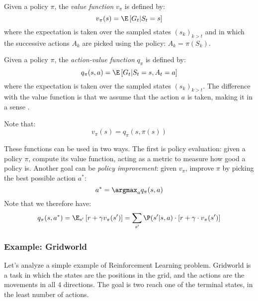 \begin{definition}
    Given a policy $\pi$, the \emph{value function} $v_\pi$ is defined by:
    \begin{equation*}
        v_\pi(s) = \E\left[G_t|S_t=s\right]
    \end{equation*}
    where the expectation is taken over the sampled states $(s_k)_{k>t}$ and in which the successive actions $A_k$ are picked using the policy: $A_k=\pi(S_k)$.
\end{definition}

\begin{definition}
    Given a policy $\pi$, the \emph{action-value function} $q_\pi$ is defined by:
    \begin{equation*}
        q_\pi(s, a) = \E\left[G_t|S_t=s, A_t=a\right]
    \end{equation*}
    where the expectation is taken over the sampled states $(s_k)_{k>t}$. The difference with the value function is that we assume that the action $a$ is taken, making it in a sense .
\end{definition}
Note that:
\begin{equation*}
    v_\pi(s)=q_\pi(s,\pi(s))
\end{equation*}

These functions can be used in two ways. The first is policy evaluation: given a policy $\pi$, compute its value function, acting as a metric to measure how good a policy is. 
Another goal can be \emph{policy improvement}: given $v_\pi$, improve $\pi$ by picking the best possible action $a^*$:
\begin{equation*}
    a^* = \argmax_a q_\pi(s,a)
\end{equation*}
Note that we therefore have:
\begin{equation*}
    q_\pi(s,a^*) = \E_{s'}\left[r+\gamma v_\pi(s')\right] = \sum_{s'}\P(s'|s,a)\cdot[r+\gamma\cdot v_\pi(s')]
\end{equation*}

\subsubsection{Example: Gridworld}
Let's analyze a simple example of Reinforcement Learning problem. Gridworld is a task in which the states are the positions in the grid, and the actions are the movements in all 4 directions. The goal is two reach one of the terminal states, in the least number of actions.

